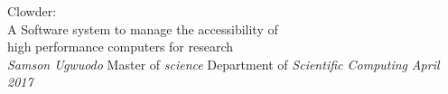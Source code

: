 \documentclass[dvips,letterpaper,12pt]{report}
\begin{document}

\thesistitle
	{Clowder: \\
	 A Software system to manage the accessibility of \\
high performance computers for research \\
	 \footnotesize}
	{\emph{Samson Ugwuodo}}
	{Master of \emph{science}}
	{Department of \emph{Scientific Computing}}		
	{\emph{April 2017}}

















\appendix

\end{document}
